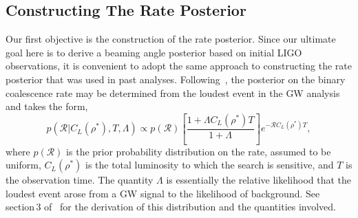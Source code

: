 \documentclass[twocolumn,nofootinbib]{revtex4-1}
\newcommand{\cbcrate}{{{\mathcal R}}}
\newcommand{\rhostar}{{\rho^*}}
\begin{document}
\subsection{Constructing The Rate Posterior}
Our first objective is the construction of the rate posterior.
Since our ultimate goal here is to derive a beaming angle posterior based on initial LIGO observations, it is convenient to adopt the same approach to constructing the rate posterior that was used in past analyses.
Following~\cite{Biswas09,BradyFairhurst08}, the posterior on the binary coalescence rate may be determined from the loudest event in the \ac{GW} analysis and takes the form,
%
%
%
%
%
\begin{equation}\label{eq:loudestEventPosterior}
p(\cbcrate | C_L({\rhostar}), T, \Lambda) \propto p(\cbcrate) \left[ \frac{1+\Lambda
C_L(\rhostar) T}{1+\Lambda}\right] e^{-\cbcrate C_L(\rhostar) T},
\end{equation}
%
where $p(\cbcrate)$ is the prior probability distribution on the rate, assumed to be uniform, $C_L(\rhostar)$ is the total luminosity to which the search is sensitive, and $T$ is the observation time.
The quantity $\Lambda$ is essentially the relative likelihood that the loudest event arose from a \ac{GW} signal to the likelihood of background.
See section\,3 of~\cite{BradyFairhurst08} for the derivation of this distribution and the quantities involved.
\end{document}
